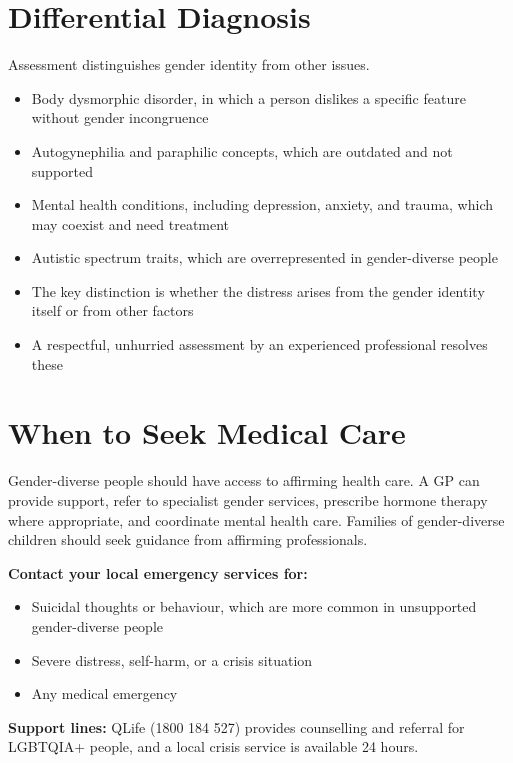 \section*{Differential Diagnosis}
Assessment distinguishes gender identity from other issues.
\begin{itemize}
    \item Body dysmorphic disorder, in which a person dislikes a specific feature without gender incongruence
    \item Autogynephilia and paraphilic concepts, which are outdated and not supported
    \item Mental health conditions, including depression, anxiety, and trauma, which may coexist and need treatment
    \item Autistic spectrum traits, which are overrepresented in gender-diverse people
    \item The key distinction is whether the distress arises from the gender identity itself or from other factors
    \item A respectful, unhurried assessment by an experienced professional resolves these
\end{itemize}

\section*{When to Seek Medical Care}
Gender-diverse people should have access to affirming health care. A GP can provide support, refer to specialist gender services, prescribe hormone therapy where appropriate, and coordinate mental health care. Families of gender-diverse children should seek guidance from affirming professionals.

\textbf{Contact your local emergency services for:}
\begin{itemize}
    \item Suicidal thoughts or behaviour, which are more common in unsupported gender-diverse people
    \item Severe distress, self-harm, or a crisis situation
    \item Any medical emergency
\end{itemize}

\textbf{Support lines:} QLife (1800 184 527) provides counselling and referral for LGBTQIA+ people, and a local crisis service is available 24 hours.

